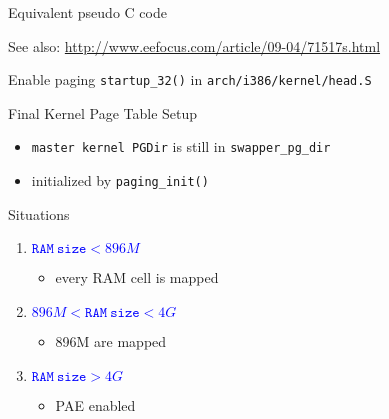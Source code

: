 \begin{frame}
  \begin{block}{Equivalent pseudo C code}
    \begin{center}
    \end{center}
  \end{block}
\end{frame}

See also: \url{http://www.eefocus.com/article/09-04/71517s.html}

\begin{frame}{Enable paging}
  \texttt{startup\_32()} in \texttt{arch/i386/kernel/head.S}
  \begin{center}
  \end{center}
\end{frame}

\begin{frame}{Final Kernel Page Table Setup}
  \begin{itemize}
  \item \texttt{master kernel PGDir} is still in \texttt{swapper\_pg\_dir}
  \item initialized by \texttt{paging\_init()}
  \end{itemize}
  
  \begin{block}{Situations}
    \begin{enumerate}
    \item \textcolor{blue}{$\mathtt{RAM\ size} < 896M$}
      \begin{itemize}
      \item every RAM cell is mapped
      \end{itemize}
    \item \textcolor{blue}{$896M < \mathtt{RAM\ size} < 4G$}
      \begin{itemize}
      \item 896M are mapped
      \end{itemize}
    \item \textcolor{blue}{$\mathtt{RAM\ size} > 4G$}
      \begin{itemize}
      \item PAE enabled
      \end{itemize}
    \end{enumerate}
  \end{block}
\end{frame}

